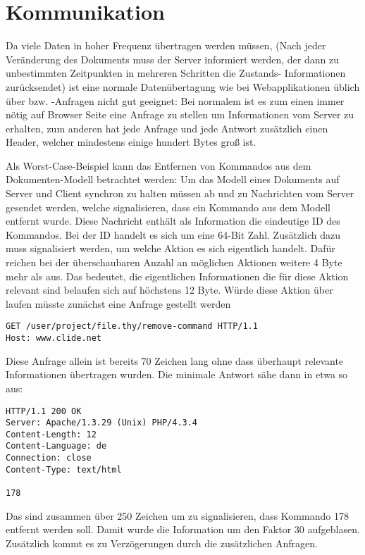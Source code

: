 \section{Kommunikation}
\label{sec:comm}

Da viele Daten in hoher Frequenz übertragen werden müssen, (Nach jeder Veränderung des Dokuments
muss der Server informiert werden, der dann zu unbestimmten Zeitpunkten in mehreren Schritten die
Zustands- Informationen zurücksendet) ist eine normale Datenübertagung wie bei Webapplikationen
üblich über  bzw. -Anfragen nicht gut geeignet: Bei normalem  ist es
zum einen immer nötig auf Browser Seite eine Anfrage zu stellen um Informationen vom Server zu
erhalten, zum anderen hat jede Anfrage und jede Antwort zusätzlich einen Header, welcher mindestens
einige hundert Bytes groß ist.

Als Worst-Case-Beispiel kann das Entfernen von Kommandos aus dem Dokumenten-Modell betrachtet
werden: Um das Modell eines Dokuments auf Server und Client synchron zu halten müssen ab und zu
Nachrichten vom Server gesendet werden, welche signalisieren, dass ein Kommando aus dem Modell
entfernt wurde. Diese Nachricht enthält als Information die eindeutige ID des Kommandos. Bei der ID
handelt es sich um eine 64-Bit Zahl. Zusätzlich dazu muss signalisiert werden, um welche Aktion es
sich eigentlich handelt. Dafür reichen bei der überschaubaren Anzahl an möglichen Aktionen weitere 4
Byte mehr als aus. Das bedeutet, die eigentlichen Informationen die für diese Aktion relevant sind
belaufen sich auf höchstens 12 Byte. Würde diese Aktion über  laufen müsste zunächst eine
Anfrage gestellt werden

\begin{lstlisting}
GET /user/project/file.thy/remove-command HTTP/1.1
Host: www.clide.net
\end{lstlisting}

Diese Anfrage allein ist bereits 70 Zeichen lang ohne dass überhaupt relevante Informationen
übertragen wurden. Die minimale Antwort sähe dann in etwa so aus:

\begin{lstlisting}
HTTP/1.1 200 OK
Server: Apache/1.3.29 (Unix) PHP/4.3.4
Content-Length: 12
Content-Language: de
Connection: close
Content-Type: text/html

178
\end{lstlisting}

Das sind zusammen über 250 Zeichen um zu signalisieren, dass Kommando 178 entfernt werden soll.
Damit wurde die Information um den Faktor 30 aufgeblasen. Zusätzlich kommt es zu Verzögerungen durch
die zusätzlichen Anfragen. 

